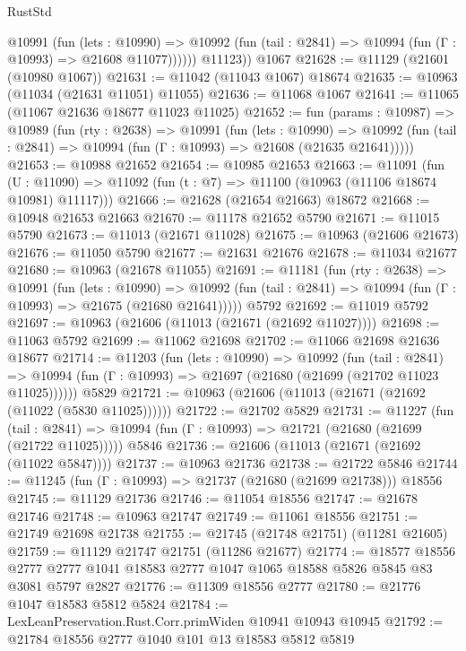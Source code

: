 \begin{lexlean}{RustStd}
\begin{coremodule}
            @10991
              (fun (lets : @10990) =>
              @10992 (fun (tail : @2841) => @10994 (fun (Γ : @10993) => @21608 @11077))))))
        @11123))
    @1067
@21628 := @11129 (@21601 (@10980 @1067))
@21631 := @11042 (@11043 @1067) @18674
@21635 := @10963 (@11034 (@21631 @11051) @11055)
@21636 := @11068 @1067
@21641 := @11065 (@11067 @21636 @18677 @11023 @11025)
@21652 := fun (params : @10987) =>
  @10989
    (fun (rty : @2638) =>
    @10991
      (fun (lets : @10990) =>
      @10992 (fun (tail : @2841) => @10994 (fun (Γ : @10993) => @21608 (@21635 @21641)))))
@21653 := @10988 @21652
@21654 := @10985 @21653
@21663 := @11091
    (fun (U : @11090) => @11092 (fun (t : @7) => @11100 (@10963 (@11106 @18674 @10981) @11117)))
@21666 := @21628 (@21654 @21663) @18672
@21668 := @10948 @21653 @21663
@21670 := @11178 @21652 @5790
@21671 := @11015 @5790
@21673 := @11013 (@21671 @11028)
@21675 := @10963 (@21606 @21673)
@21676 := @11050 @5790
@21677 := @21631 @21676
@21678 := @11034 @21677
@21680 := @10963 (@21678 @11055)
@21691 := @11181
    (fun (rty : @2638) =>
    @10991
      (fun (lets : @10990) =>
      @10992 (fun (tail : @2841) => @10994 (fun (Γ : @10993) => @21675 (@21680 @21641)))))
    @5792
@21692 := @11019 @5792
@21697 := @10963 (@21606 (@11013 (@21671 (@21692 @11027))))
@21698 := @11063 @5792
@21699 := @11062 @21698
@21702 := @11066 @21698 @21636 @18677
@21714 := @11203
    (fun (lets : @10990) =>
    @10992
      (fun (tail : @2841) =>
      @10994 (fun (Γ : @10993) => @21697 (@21680 (@21699 (@21702 @11023 @11025))))))
    @5829
@21721 := @10963 (@21606 (@11013 (@21671 (@21692 (@11022 (@5830 @11025))))))
@21722 := @21702 @5829
@21731 := @11227
    (fun (tail : @2841) => @10994 (fun (Γ : @10993) => @21721 (@21680 (@21699 (@21722 @11025)))))
    @5846
@21736 := @21606 (@11013 (@21671 (@21692 (@11022 @5847))))
@21737 := @10963 @21736
@21738 := @21722 @5846
@21744 := @11245 (fun (Γ : @10993) => @21737 (@21680 (@21699 @21738))) @18556
@21745 := @11129 @21736
@21746 := @11054 @18556
@21747 := @21678 @21746
@21748 := @10963 @21747
@21749 := @11061 @18556
@21751 := @21749 @21698 @21738
@21755 := @21745 (@21748 @21751) (@11281 @21605)
@21759 := @11129 @21747 @21751 (@11286 @21677)
@21774 := @18577
    @18556
    @2777
    @2777
    @1041
    @18583
    @2777
    @1047
    @1065
    @18588
    @5826
    @5845
    @83
    @3081
    @5797
    @2827
@21776 := @11309 @18556 @2777
@21780 := @21776 @1047 @18583 @5812 @5824
@21784 := LexLeanPreservation.Rust.Corr.primWiden @10941 @10943 @10945
@21792 := @21784 @18556 @2777 @1040 @101 @13 @18583 @5812 @5819

\end{coremodule}
\end{lexlean}
